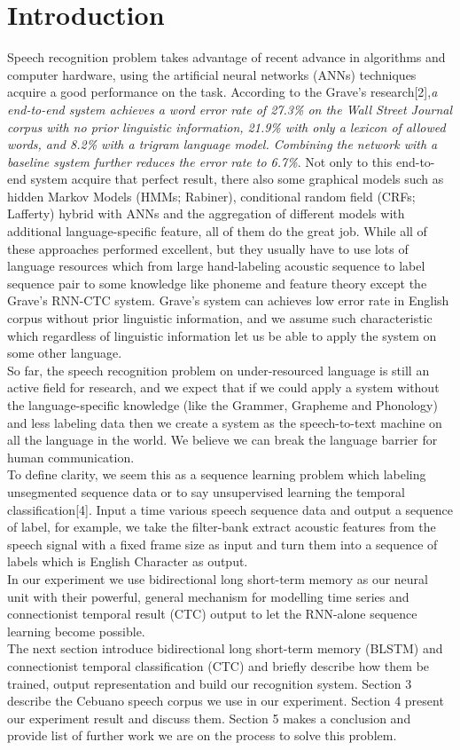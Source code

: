 \documentclass[conference]{IEEEtran}
\begin{document}
\section{Introduction}
Speech recognition problem takes advantage of recent advance in algorithms and computer hardware, using the artificial neural networks (ANNs) techniques acquire a good performance on the task.  According to the Grave's research[2],{\it a end-to-end system achieves a word error rate of 27.3\% on the Wall Street Journal corpus with no prior linguistic information, 21.9\% with only a lexicon of allowed words, and 8.2\% with a trigram language model. Combining the network with a baseline system further reduces the error rate to 6.7\%}.  Not only to this end-to-end system acquire that perfect result, there also some graphical models such as hidden Markov Models (HMMs; Rabiner), conditional random field (CRFs; Lafferty) hybrid with ANNs and the aggregation of different models with additional language-specific feature, all of them do the great job.  While all of these approaches performed excellent, but they usually have to use lots of language resources which from large hand-labeling acoustic sequence to label sequence pair to some knowledge like phoneme and feature theory except the Grave's RNN-CTC system.  Grave's system can achieves low error rate in English corpus without prior linguistic information, and we assume such characteristic which regardless of linguistic information let us be able to apply the system on some other language. \\
So far, the speech recognition problem on under-resourced language is still an active field for research, and we expect that if we could apply a system without the language-specific knowledge (like the Grammer, Grapheme and Phonology) and less labeling data then we create a system as the speech-to-text machine on all the language in the world. We believe we can break the language barrier for human communication.  \\
To define clarity, we seem this as a sequence learning problem which labeling unsegmented sequence data or to say unsupervised learning the temporal classification[4]. Input a time various speech sequence data and output a sequence of label, for example, we take the filter-bank extract acoustic features from the speech signal with a fixed frame size as input  and turn them into a sequence of labels which is English Character as output.  \\
In our experiment we use bidirectional long short-term memory as our neural unit with their powerful, general mechanism for modelling time series and connectionist temporal result (CTC) output to let the RNN-alone sequence learning become possible.  \\
The next section introduce bidirectional long short-term memory (BLSTM) and connectionist temporal classification (CTC) and briefly describe how them be trained, output representation and build our recognition system.  Section 3 describe the Cebuano speech corpus we use in our experiment.  Section 4 present our experiment result and discuss them.  Section 5 makes a conclusion and provide list of further work we are on the process to solve this problem. 
\end{document}
